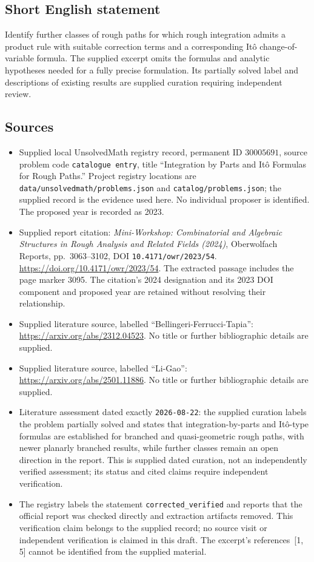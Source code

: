 \documentclass[11pt]{article}
\begin{document}
\subsection{Short English statement}
Identify further classes of rough paths for which rough integration admits a product rule with suitable correction terms and a corresponding It\^o change-of-variable formula. The supplied excerpt omits the formulas and analytic hypotheses needed for a fully precise formulation. Its partially solved label and descriptions of existing results are supplied curation requiring independent review.
\subsection{Sources}
\begin{itemize}
\item Supplied local UnsolvedMath registry record, permanent ID \(30005691\), source problem code \texttt{catalogue entry}, title ``Integration by Parts and It\^o Formulas for Rough Paths.'' Project registry locations are \texttt{data/unsolvedmath/problems.json} and \texttt{catalog/problems.json}; the supplied record is the evidence used here. No individual proposer is identified. The proposed year is recorded as 2023.
\item Supplied report citation: \emph{Mini-Workshop: Combinatorial and Algebraic Structures in Rough Analysis and Related Fields (2024)}, Oberwolfach Reports, pp.~3063--3102, DOI \texttt{10.4171/owr/2023/54}. \url{https://doi.org/10.4171/owr/2023/54}. The extracted passage includes the page marker 3095. The citation's 2024 designation and its 2023 DOI component and proposed year are retained without resolving their relationship.
\item Supplied literature source, labelled ``Bellingeri-Ferrucci-Tapia'': \url{https://arxiv.org/abs/2312.04523}. No title or further bibliographic details are supplied.
\item Supplied literature source, labelled ``Li-Gao'': \url{https://arxiv.org/abs/2501.11886}. No title or further bibliographic details are supplied.
\item Literature assessment dated exactly \texttt{2026-08-22}: the supplied curation labels the problem partially solved and states that integration-by-parts and It\^o-type formulas are established for branched and quasi-geometric rough paths, with newer planarly branched results, while further classes remain an open direction in the report. This is supplied dated curation, not an independently verified assessment; its status and cited claims require independent verification.
\item The registry labels the statement \texttt{corrected\_verified} and reports that the official report was checked directly and extraction artifacts removed. This verification claim belongs to the supplied record; no source visit or independent verification is claimed in this draft. The excerpt's references~[1, 5] cannot be identified from the supplied material.
\end{itemize}
\end{document}
